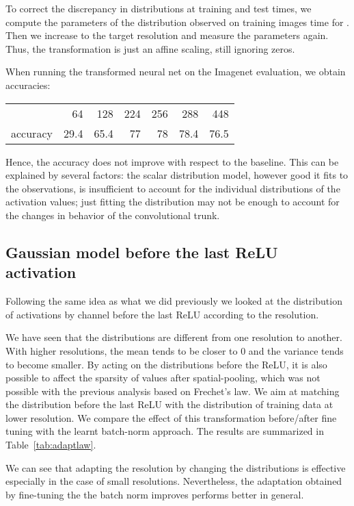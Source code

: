 \documentclass{article}
\begin{document}
To correct the discrepancy in distributions at training and test times, we compute the parameters  of the distribution observed on training images time for . 
Then we increase  to the target resolution and measure the parameters  again. 
Thus, the transformation is just an affine scaling, still ignoring zeros.

When running the transformed neural net on the Imagenet evaluation, we obtain accuracies: 
\begin{center}
\begin{tabular}{|l|rrrrrr|}
\hline 
 & 64 & 128 & 224 & 256 & 288 & 448 \\
    accuracy & 29.4 & 65.4 & 77 &78 & 78.4 & 76.5 \\
\hline
\end{tabular}
\end{center}
Hence, the accuracy does not improve with respect to the baseline. 
This can be explained by several factors: 
the scalar distribution model, however good it fits to the observations, is insufficient to account for the individual distributions of the activation values; 
just fitting the distribution may not be enough to account for the changes in behavior of the convolutional trunk.




\subsection{Gaussian model before the last ReLU activation}

Following the same idea as what we did previously we looked at the distribution of activations by channel  before the last ReLU according to the resolution.

We have seen that the distributions are different from one resolution to another. 
With higher resolutions,  the mean tends to be closer to 0 and the variance tends to become smaller.
By acting on the distributions before the ReLU, it is also possible to affect the sparsity of values after spatial-pooling, which was not possible with the previous analysis based on Frechet's law.
We aim at matching the distribution before the last ReLU with the distribution of training data at lower resolution. 
We compare the effect of this transformation before/after fine tuning with the learnt batch-norm approach. 
The results are summarized in Table~\ref{tab:adaptlaw}.

We can see that adapting the resolution by changing the distributions is effective especially in the case of small resolutions. 
Nevertheless, the adaptation obtained by fine-tuning the the batch norm improves performs better in general.
\end{document}
